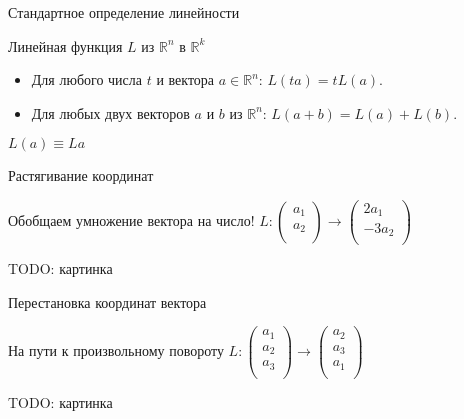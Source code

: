 \documentclass[14pt,xcolor=dvipsnames]{beamer}
\newcommand\R{\mathbb{R}}
\begin{document}
\begin{frame}{Стандартное определение линейности}

\begin{block}{Линейная функция $L$ из $\R^n$ в $\R^k$}
\begin{itemize}
  \item Для любого числа $t$ и вектора $a \in \R^n$: $L(t a) = tL(a)$.
  \item Для любых двух векторов $a$ и $b$ из $\R^n$: $L(a + b) = L(a) + L(b)$.
\end{itemize}
\end{block}

\begin{block}{$L(a) \equiv La$}
\end{block}

\end{frame}


\begin{frame}{Растягивание координат}

\begin{block}{Обобщаем умножение вектора на число!}
  $L : \begin{pmatrix}
    a_1 \\
    a_2 \\
  \end{pmatrix} \to 
  \begin{pmatrix}
    2a_1 \\
    -3a_2 \\
  \end{pmatrix}$
\end{block}

\begin{block}{TODO: картинка}

\end{block}
\end{frame}



\begin{frame}{Перестановка координат вектора}

\begin{block}{На пути к произвольному повороту}
  $L : \begin{pmatrix}
    a_1 \\
    a_2 \\
    a_3 \\
  \end{pmatrix} \to 
  \begin{pmatrix}
    a_2 \\
    a_3 \\
    a_1 \\
  \end{pmatrix}$
\end{block}

\begin{block}{TODO: картинка}

\end{block}
    
\end{frame}
\end{document}
